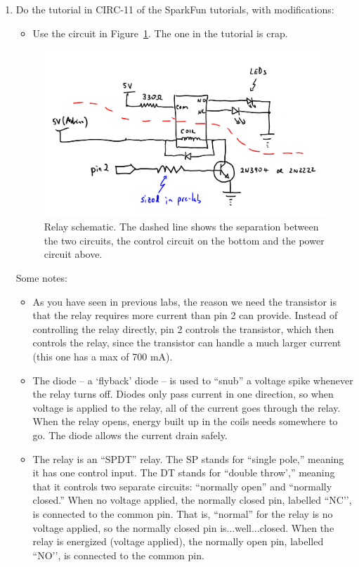 \documentclass[11pt]{article} %
\begin{document}
\begin{enumerate}
\item Do the tutorial in CIRC-11 of the SparkFun tutorials, with modifications:
\begin{itemize}
\item Use the circuit in Figure~\ref{fig:relay}. The one in the tutorial is crap.
\end{itemize}

\begin{figure}
\centering
\includegraphics[width=5in ]{figures/relay.png}
\caption{Relay schematic. The dashed line shows the separation between the two circuits, the control circuit on the bottom and the power circuit above.}
\label{fig:relay}
\end{figure}

Some notes:
\begin{itemize}
\item As you have seen in previous labs, the reason we need the transistor is that the relay requires more current than pin 2 can provide. Instead of controlling the relay directly, pin 2 controls the transistor, which then controls the relay, since the transistor can handle a much larger current (this one has a max of 700 mA).
\item The diode -- a `flyback' diode -- is used to ``snub'' a voltage spike whenever the relay turns off. Diodes only pass current in one direction, so when voltage is applied to the relay, all of the current goes through the relay. When the relay opens, energy built up in the coils needs somewhere to go. The diode allows the current drain safely.
\item The relay is an ``SPDT'' relay. The SP stands for ``single pole,'' meaning it has one control input. The DT stands for ``double throw','' meaning that it controls two separate circuits: ``normally open'' and ``normally closed.'' When no voltage applied, the normally closed pin, labelled ``NC’’, is connected to the common pin. That is, “normal” for the relay is no voltage applied, so the normally closed pin is...well...closed. When the relay is energized (voltage applied), the normally open pin, labelled ``NO’’, is connected to the common pin. 
\end{itemize}
\end{enumerate}
\end{document}
